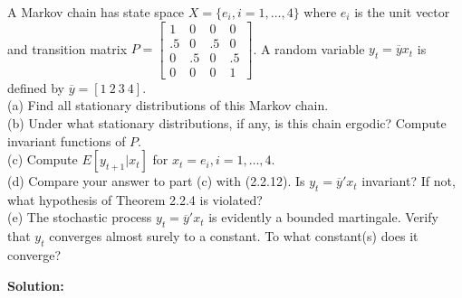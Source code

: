 \documentclass[12pt, letterpaper]{article}
\newcommand{\yb}{\overline{y}}
\begin{document}
\begin{tcolorbox}[evenbox,title={Exercise 2.18 \quad Random Walk}]
\begin{tcolorbox}[questionbox]
A Markov chain has state space $X=\{e_i,i=1,\dots,4\}$ where $e_i$ is the unit vector and transition
matrix $P=\begin{bmatrix}1&0&0&0\\.5&0&.5&0\\0&.5&0&.5\\0&0&0&1\end{bmatrix}$. A random variable
$y_t=\yb x_t$ is defined by $\yb=[1\ 2\ 3\ 4]$.\\[3pt]
(a) Find all stationary distributions of this Markov chain.\\
(b) Under what stationary distributions, if any, is this chain ergodic? Compute invariant functions
of $P$.\\
(c) Compute $E[y_{t+1}|x_t]$ for $x_t=e_i,i=1,\dots,4$.\\
(d) Compare your answer to part (c) with (2.2.12). Is $y_t=\yb'x_t$ invariant? If not, what
hypothesis of Theorem 2.2.4 is violated?\\
(e) The stochastic process $y_t=\yb'x_t$ is evidently a bounded martingale. Verify that $y_t$
converges almost surely to a constant. To what constant(s) does it converge?
\end{tcolorbox}

\textbf{Solution:}


\end{tcolorbox}
\end{document}
